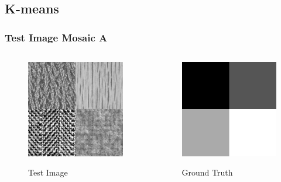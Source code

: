\documentclass[11pt]{beamer}
\begin{document}
\subsection{K-means}
\begin{frame}
\frametitle{Test Image Mosaic A}
\begin{columns}[onlytextwidth]
\begin{column}{.45\textwidth}
\begin{figure}
  \colorbox{gray!20}{\includegraphics[width=.9\textwidth]{mosaicA.png}}
  \caption{Test Image}
\end{figure}
\end{column}
\hfill
\begin{column}{.45\textwidth}
\begin{figure}
  \colorbox{gray!20}{\includegraphics[width=.9\textwidth]{mapA.png}}
  \caption{Ground Truth}
\end{figure}
\end{column}
\end{columns}
\end{frame}
\end{document}
